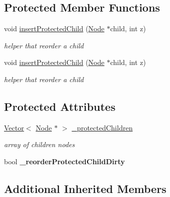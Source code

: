 \subsection*{Protected Member Functions}
\begin{DoxyCompactItemize}
\item 
\mbox{\label{classProtectedNode_ab84c3855f4c6e6b7b2e268080a9eb945}} 
void \hyperlink{classProtectedNode_ab84c3855f4c6e6b7b2e268080a9eb945}{insert\+Protected\+Child} (\hyperlink{classNode}{Node} $\ast$child, int z)
\begin{DoxyCompactList}\small\item\em helper that reorder a child \end{DoxyCompactList}\item 
\mbox{\label{classProtectedNode_ab84c3855f4c6e6b7b2e268080a9eb945}} 
void \hyperlink{classProtectedNode_ab84c3855f4c6e6b7b2e268080a9eb945}{insert\+Protected\+Child} (\hyperlink{classNode}{Node} $\ast$child, int z)
\begin{DoxyCompactList}\small\item\em helper that reorder a child \end{DoxyCompactList}\end{DoxyCompactItemize}
\subsection*{Protected Attributes}
\begin{DoxyCompactItemize}
\item 
\mbox{\label{classProtectedNode_ae167540d88b3ac29488157eb48a4e426}} 
\hyperlink{classVector}{Vector}$<$ \hyperlink{classNode}{Node} $\ast$ $>$ \hyperlink{classProtectedNode_ae167540d88b3ac29488157eb48a4e426}{\+\_\+protected\+Children}
\begin{DoxyCompactList}\small\item\em array of children nodes \end{DoxyCompactList}\item 
\mbox{\label{classProtectedNode_a262c30fcdccce57c1a51d599ea8f6297}} 
bool {\bfseries \+\_\+reorder\+Protected\+Child\+Dirty}
\end{DoxyCompactItemize}
\subsection*{Additional Inherited Members}



